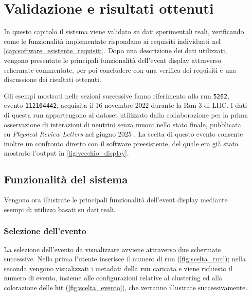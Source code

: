 \chapter{Validazione e risultati ottenuti}
\label{cap:risultati}
In questo capitolo il sistema viene validato su dati sperimentali reali, verificando come le funzionalità implementate rispondano ai requisiti individuati nel \cref{cap:software_esistente_requisiti}.
Dopo una descrizione dei dati utilizzati, vengono presentate le principali funzionalità dell'event display attraverso schermate commentate, per poi concludere con una verifica dei requisiti e una discussione dei risultati ottenuti.

Gli esempi mostrati nelle sezioni successive fanno riferimento alla run \texttt{5262}, evento \texttt{112104442}, acquisita il 16 novembre 2022 durante la Run 3 di LHC.
I dati di questa run appartengono al dataset utilizzato dalla collaborazione per la prima osservazione di interazioni di neutrini senza muoni nello stato finale, pubblicata su \textit{Physical Review Letters} nel giugno 2025 \cite{SND_Observation}.
La scelta di questo evento consente inoltre un confronto diretto con il software preesistente, del quale era già stato mostrato l'output in \cref{fig:vecchio_display}.

%
%
\section{Funzionalità del sistema}
Vengono ora illustrate le principali funzionalità dell'event display mediante esempi di utilizzo basati su dati reali.

\subsection{Selezione dell'evento}
La selezione dell'evento da visualizzare avviene attraverso due schermate successive.
Nella prima l'utente inserisce il numero di run (\cref{fig:scelta_run}); nella seconda vengono visualizzati i metadati della run caricata e viene richiesto il numero di evento, insieme alle configurazioni relative al clustering ed alla colorazione delle hit (\cref{fig:scelta_evento}), che verranno illustrate successivamente.

